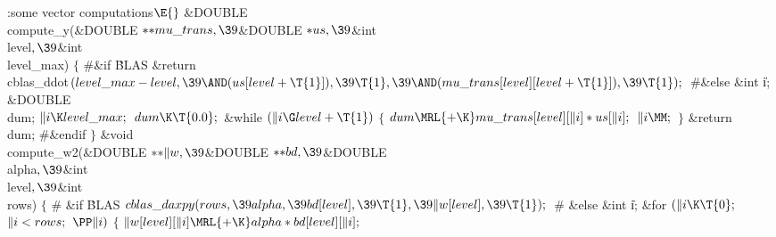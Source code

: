 \Y\B\4:some vector computations\X${}\E{}$\6
\&{DOUBLE} \\{compute\_y}(\&{DOUBLE} ${}{*}{*}\\{mu\_trans},\39{}$\&{DOUBLE}
${}{*}\\{us},\39{}$\&{int} \\{level}${},\39{}$\&{int} \\{level\_max})\1\1\2\2\6
${}\{{}$\6
\8\#\&{if} \.{BLAS}\1\6
\&{return} \\{cblas\_ddot}${}(\\{level\_max}-\\{level},\39{\AND}(\\{us}[%
\\{level}+\T{1}]),\39\T{1},\39{\AND}(\\{mu\_trans}[\\{level}][\\{level}+%
\T{1}]),\39\T{1});{}$\6
\8\#\&{else}\7
\&{int} \|i;\6
\&{DOUBLE} \\{dum};\7
${}\|i\K\\{level\_max};{}$\6
${}\\{dum}\K\T{0.0};{}$\6
\&{while} ${}(\|i\G\\{level}+\T{1}){}$\5
${}\{{}$\1\6
${}\\{dum}\MRL{+{\K}}\\{mu\_trans}[\\{level}][\|i]*\\{us}[\|i];{}$\6
${}\|i\MM;{}$\6
\4${}\}{}$\2\6
\&{return} \\{dum};\6
\8\#\&{endif}\6
\4${}\}{}$\2\6
\&{void} \\{compute\_w2}(\&{DOUBLE} ${}{*}{*}\|w,\39{}$\&{DOUBLE} ${}{*}{*}%
\\{bd},\39{}$\&{DOUBLE} \\{alpha}${},\39{}$\&{int} \\{level}${},\39{}$\&{int} %
\\{rows})\1\1 $\{$ $\#$ \6
\&{if} \.{BLAS}\1\5
${}\\{cblas\_daxpy}(\\{rows},\39\\{alpha},\39\\{bd}[\\{level}],\39\T{1},\39\|w[%
\\{level}],\39\T{1});{}$\2\6
$\#$ \6
\&{else}\1\5
\&{int} \|i;\7
\&{for} ${}(\|i\K\T{0};{}$ ${}\|i<\\{rows};{}$ ${}\PP\|i){}$\5
${}\{{}$\1\6
${}\|w[\\{level}][\|i]\MRL{+{\K}}\\{alpha}*\\{bd}[\\{level}][\|i];{}$\6
